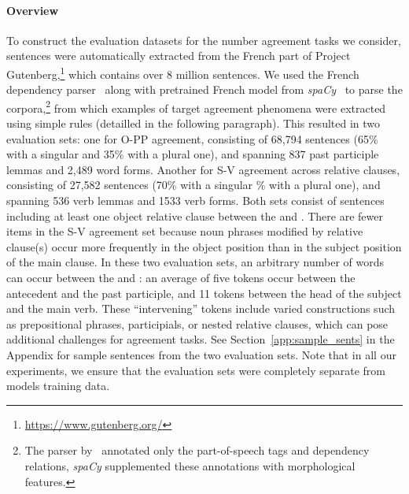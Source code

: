 \paragraph{Overview} To construct the evaluation datasets for the number agreement tasks we consider, sentences were automatically extracted from the
French part of Project Gutenberg,\footnote{\url{https://www.gutenberg.org/}} which contains over 8 million sentences. We used
the French dependency parser~\citep{grobol-crabbe-2021-analyse} along with
pretrained French model from \textit{spaCy}~\citep{spacy} to parse the corpora,\footnote{The parser by~\cite{grobol-crabbe-2021-analyse} annotated only the part-of-speech tags and dependency relations, \textit{spaCy} supplemented these annotations with morphological features.} from which examples of target agreement phenomena were extracted using simple rules (detailled in the following paragraph).  This resulted in two evaluation sets: one for \ac{O-PP agreement}, consisting of 68,794 sentences (65\% with a singular \target and 35\% with a plural one), and spanning 837 past participle lemmas and 2,489 word forms. Another for \ac{S-V agreement} across relative clauses, consisting of 27,582 sentences (70\% with a singular \% with a plural one), and spanning 536 verb lemmas and 1533 verb forms. Both sets consist of sentences including at least one object relative clause between the \cue and \target. There are fewer items in the S-V agreement set because noun phrases modified by relative clause(s) occur more frequently in the object position than in the subject position of the main clause. In these two
evaluation sets, an arbitrary number of words can occur between the
\cue and \target: an average of five tokens occur between the antecedent and the past participle, and 11 tokens between the head of the
subject and the main verb. These “intervening” tokens include varied
constructions such as prepositional phrases, participials, or nested
relative clauses, which can pose additional challenges for agreement tasks. See Section~\ref{app:sample_sents} in the Appendix for sample sentences from the two evaluation sets. Note that in all our experiments, we ensure that the evaluation sets were completely separate from models training data.


